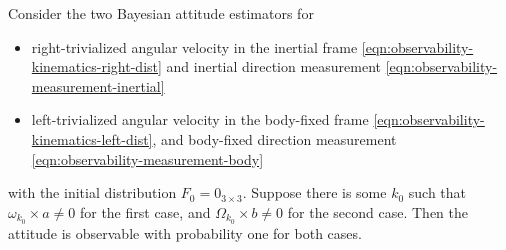 \begin{theorem} \label{thm:observability-obs}
	Consider the two Bayesian attitude estimators for
	\begin{itemize}
		\item right-trivialized angular velocity in the inertial frame  \eqref{eqn:observability-kinematics-right-dist} and inertial direction measurement \eqref{eqn:observability-measurement-inertial} 
		\item left-trivialized angular velocity in the body-fixed frame \eqref{eqn:observability-kinematics-left-dist}, and body-fixed direction measurement \eqref{eqn:observability-measurement-body}  
	\end{itemize}
	with the initial distribution $F_0=0_{3\times 3}$.
	Suppose there is some $k_0$ such that $\omega_{k_0} \times a \neq 0$ for the first case, and $\Omega_{k_0} \times b \neq 0$ for the second case. Then the attitude is observable with probability one for both cases.
\end{theorem}
